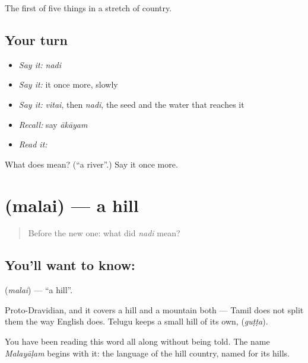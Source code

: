 \begin{grammarlens}[title={What you've built}]
The first of five things in a stretch of country.
\end{grammarlens}

\subsection*{Your turn}
\begin{itemize}
\raggedright
  \item \emph{Say it:} \emph{nadi}
  \item \emph{Say it:} it once more, slowly
  \item \emph{Say it:} \emph{vitai}, then \emph{nadi}, the seed and the water that reaches it
  \item \emph{Recall:} say \emph{ākāyam}
  \item \emph{Read it:} \textbf{}
\end{itemize}

\begin{tcolorbox}[breakable,colback=teal!4,colframe=teal!35!black,title={Before you move on}]
What does  mean? (\textquotedblleft{}a river\textquotedblright{}.) Say it once more.
\end{tcolorbox}
\section[\texorpdfstring{\ta{மலை} (malai)}{மலை (malai)}]{ (malai) — a hill}

\label{lesson:TA-C53-hill}



\begin{quote}
Before the new one: what did \emph{nadi} mean?
\end{quote}

\subsection*{You'll want to know: }
\textbf{} (\emph{malai}) — \textquotedblleft{}a hill\textquotedblright{}.

Proto-Dravidian, and it covers a hill and a mountain both — Tamil does not split them the way English does. Telugu keeps a small hill of its own,  (\emph{guṭṭa}).

You have been reading this word all along without being told. The name \emph{Malayāḷam} begins with it: the language of the hill country, named for its hills.

